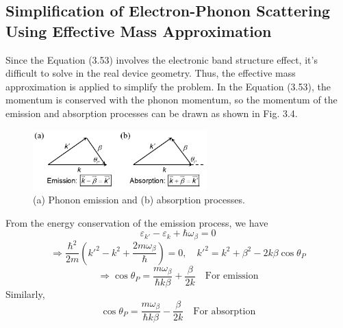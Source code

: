 \subsection{Simplification of Electron-Phonon Scattering Using Effective Mass Approximation}
Since the Equation (3.53) involves the electronic band structure effect, it's difficult to solve in the real device geometry. Thus, the effective mass approximation is applied to simplify the problem. In the Equation (3.53), the momentum is conserved with the phonon momentum, so the momentum of the emission and absorption processes can be drawn as shown in Fig. 3.4.
\begin{figure}[tbp]
\includegraphics[width=0.6\textwidth]{figures/Fig3_4}
\centering
\caption{\small (a) Phonon emission and (b) absorption processes.}
\end{figure}
From the energy conservation of the emission process, we have \begin{equation}
    \varepsilon_{k'}-\varepsilon_{k}+\hbar\omega_{\beta} = 0\nonumber
\end{equation} \begin{equation}
    \Rightarrow \frac{\hbar^{2}}{2m}\left(k'^{2}-k^{2}+\frac{2m\omega_{\beta}}{\hbar}\right) = 0, \quad k'^{2} = k^{2}+\beta^{2}-2k\beta\cos{\theta_{P}}\nonumber
\end{equation} \begin{equation}
    \Rightarrow \boxed{\cos{\theta_{P}} = \frac{m\omega_{\beta}}{\hbar k \beta}+\frac{\beta}{2k}} \quad \text{For emission}
\end{equation} Similarly, \begin{equation}
    \boxed{\cos{\theta_{P}} = \frac{m\omega_{\beta}}{\hbar k \beta}-\frac{\beta}{2k}} \quad \text{For absorption}
\end{equation}
